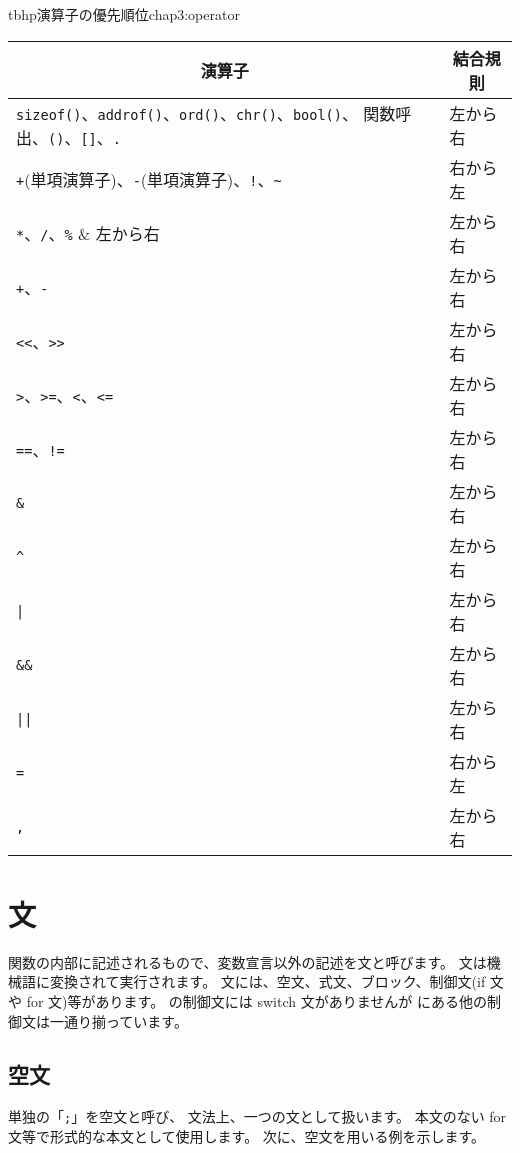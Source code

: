 \begin{mytable}{tbhp}{演算子の優先順位}{chap3:operator}
\begin{tabular}{l|l}
\hline
\multicolumn{1}{c}{演算子} & \multicolumn{1}{|c}{結合規則} \\
\hline
\verb/sizeof()/、\verb/addrof()/、\verb/ord()/、\verb/chr()/、\verb/bool()/、
関数呼出、\verb/()/、\verb/[]/、\verb/./ & 左から右 \\
\verb/+/(単項演算子)、\verb/-/(単項演算子)、\verb/!/、\verb/~/ & 右から左 \\
\verb/*/、\verb!/!、\verb/%/             & 左から右 \\
\verb/+/、\verb/-/                       & 左から右 \\
\verb/<</、\verb/>>/                     & 左から右 \\
\verb/>/、\verb/>=/、\verb/</、\verb/<=/ & 左から右 \\
\verb/==/、\verb/!=/                     & 左から右 \\
\verb/&/                                 & 左から右 \\
\verb/^/                                 & 左から右 \\
\verb/|/                                 & 左から右 \\
\verb/&&/                                & 左から右 \\
\verb/||/                                & 左から右 \\
\verb/=/                                 & 右から左 \\
\verb/,/                                 & 左から右 \\
\end{tabular}
\end{mytable}

\section{文}

関数の内部に記述されるもので、変数宣言以外の記述を文と呼びます。
文は機械語に変換されて実行されます。
文には、空文、式文、ブロック、制御文(if 文や for 文)等があります。
\cmml の制御文には switch 文がありませんが
\cl にある他の制御文は一通り揃っています。

\subsection{空文}

単独の「\verb/;/」を空文と呼び、
文法上、一つの文として扱います。
本文のない for 文等で形式的な本文として使用します。
次に、空文を用いる例を示します。

